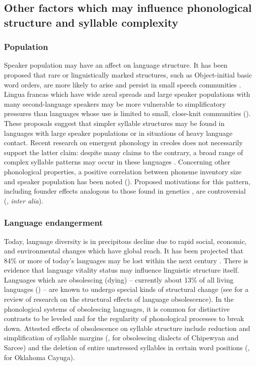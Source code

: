 \subsection{Other factors which may influence phonological structure and syllable complexity}\label{sec:2.1.2}
\subsubsection{{Population}}\label{sec:2.1.2.1}

  Speaker population may have an affect on language structure. It has been proposed that rare or linguistically marked structures, such as Object-initial basic word orders, are more likely to arise and persist in small speech communities \citep{Nettle1999a}. Lingua francas which have wide areal spreads and large speaker populations with many second-language speakers may be more vulnerable to simplificatory pressures than languages whose use is limited to small, close-knit communities (\citealt{Nettle1999b,LupyanDale2010}). These proposals suggest that simpler syllable structures may be found in languages with large speaker populations or in situations of heavy language contact. Recent research on emergent phonology in creoles does not necessarily support the latter claim: despite many claims to the contrary, a broad range of complex syllable patterns may occur in these languages \citep{Schramm2014}. Concerning other phonological properties, a positive correlation between phoneme inventory size and speaker population has been noted (\citealt{HayBauer2007}). Proposed motivations for this pattern, including founder effects analogous to those found in genetics \citep{Atkinson2011}, are controversial (\citealt{Bybee2011,MaddiesonEtAl2011,HunleyEtAl2012}, \textit{inter alia}).

\subsubsection{{Language} {endangerment}}\label{sec:2.1.2.2}

  Today, language diversity is in precipitous decline due to rapid social, economic, and environmental changes which have global reach. It has been projected that 84\% or more of today’s languages may be lost within the next century \citep[113-114]{Nettle1999b}. There is evidence that language vitality status may influence linguistic structure itself. Languages which are obsolescing (dying) -- currently about 13\% of all living languages (\citealt{SimonsFennig2018}) -- are known to undergo special kinds of structural change (see \citealt{Romaine2010} for a review of research on the structural effects of language obsolescence). In the phonological systems of obsolescing languages, it is common for distinctive contrasts to be leveled and for the regularity of phonological processes to break down. Attested effects of obsolescence on syllable structure include reduction and simplification of syllable margins (\citealt{Cook1989}, for obsolescing dialects of Chipewyan and Sarcee) and the deletion of entire unstressed syllables in certain word positions (\citealt{Mithun1989}, for Oklahoma Cayuga).

